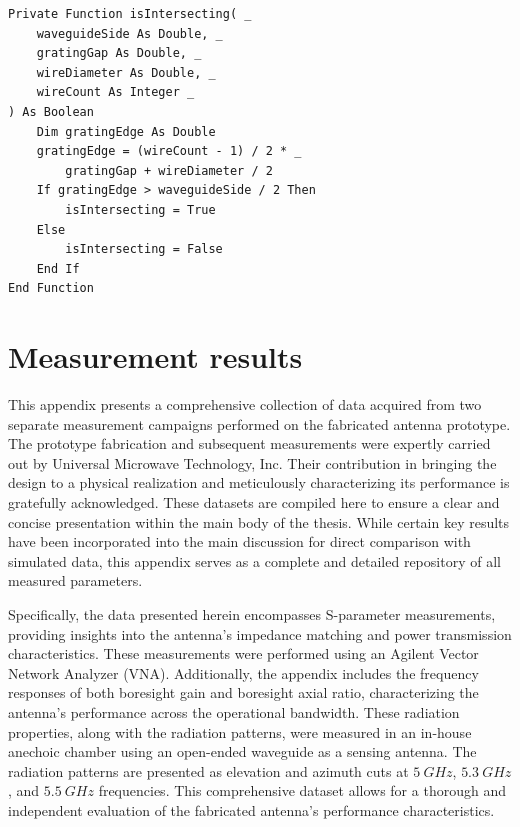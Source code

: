 \documentclass[11pt,a4paper,twoside,openany]{report}
\begin{document}
\begin{lstlisting}[caption={Check for intersection with waveguide walls}, label={lst:is-intersecting}, language=VBScript]
Private Function isIntersecting( _
    waveguideSide As Double, _
    gratingGap As Double, _
    wireDiameter As Double, _
    wireCount As Integer _
) As Boolean
    Dim gratingEdge As Double
    gratingEdge = (wireCount - 1) / 2 * _
        gratingGap + wireDiameter / 2
    If gratingEdge > waveguideSide / 2 Then
        isIntersecting = True
    Else
        isIntersecting = False
    End If
End Function
\end{lstlisting}

\chapter{Measurement results}
\label{appendix:measurement-results}
This appendix presents a comprehensive collection of data acquired from two separate measurement campaigns performed on the fabricated antenna prototype. The prototype fabrication and subsequent measurements were expertly carried out by Universal Microwave Technology, Inc. Their contribution in bringing the design to a physical realization and meticulously characterizing its performance is gratefully acknowledged. These datasets are compiled here to ensure a clear and concise presentation within the main body of the thesis. While certain key results have been incorporated into the main discussion for direct comparison with simulated data, this appendix serves as a complete and detailed repository of all measured parameters.

Specifically, the data presented herein encompasses S-parameter measurements, providing insights into the antenna's impedance matching and power transmission characteristics. These measurements were performed using an Agilent Vector Network Analyzer (VNA). Additionally, the appendix includes the frequency responses of both boresight gain and boresight axial ratio, characterizing the antenna's performance across the operational bandwidth. These radiation properties, along with the radiation patterns, were measured in an in-house anechoic chamber using an open-ended waveguide as a sensing antenna. The radiation patterns are presented as elevation and azimuth cuts at $\qty{5}{GHz}$, $\qty{5.3}{GHz}$, and $\qty{5.5}{GHz}$ frequencies. This comprehensive dataset allows for a thorough and independent evaluation of the fabricated antenna's performance characteristics.
\end{document}
